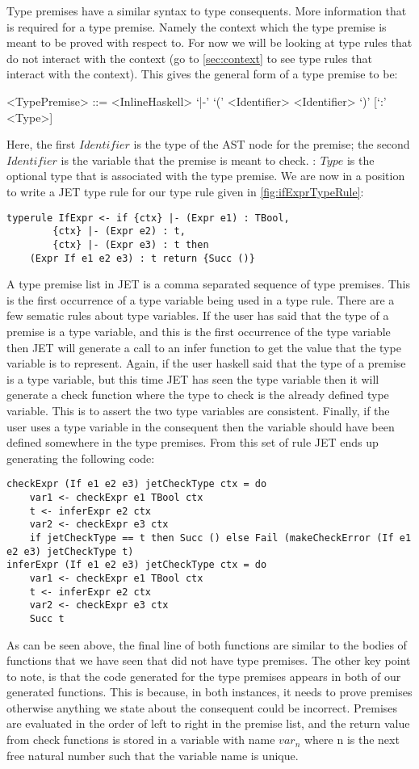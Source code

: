 Type premises have a similar syntax to type consequents.
More information that is required for a type premise.
Namely the context which the type premise is meant to be proved with respect to.
For now we will be looking at type rules that do not interact with the context (go to \autoref{sec:context} to see type rules that interact with the context).
This gives the general form of a type premise to be:
\begin{grammar}
<TypePremise> ::= <InlineHaskell> `|-' `(' <Identifier> <Identifier> `)' [`:' <Type>]
\end{grammar}
Here, the first $Identifier$ is the type of the AST node for the premise; the second $Identifier$ is the variable that the premise is meant to check.
 $:\ Type$ is the optional type that is associated with the type premise.
We are now in a position to write a JET type rule for our type rule given in \autoref{fig:ifExprTypeRule}:
\begin{lstlisting}
typerule IfExpr <- if {ctx} |- (Expr e1) : TBool, 
        {ctx} |- (Expr e2) : t, 
        {ctx} |- (Expr e3) : t then 
    (Expr If e1 e2 e3) : t return {Succ ()}
\end{lstlisting}
A type premise list in JET is a comma separated sequence of type premises.
This is the first occurrence of a type variable being used in a type rule.
There are a few sematic rules about type variables.
If the user has said that the type of a premise is a type variable, and this is the first occurrence of the type variable then JET will generate a call to an infer function to get the value that the type variable is to represent.
Again, if the user haskell said that the type of a premise is a type variable, but this time JET has seen the type variable then it will generate a check function where the type to check is the already defined type variable.
This is to assert the two type variables are consistent.
Finally, if the user uses a type variable in the consequent then the variable should have been defined somewhere in the type premises.
From this set of rule JET ends up generating the following code:
\begin{lstlisting}
checkExpr (If e1 e2 e3) jetCheckType ctx = do
    var1 <- checkExpr e1 TBool ctx
    t <- inferExpr e2 ctx
    var2 <- checkExpr e3 ctx
    if jetCheckType == t then Succ () else Fail (makeCheckError (If e1 e2 e3) jetCheckType t)
inferExpr (If e1 e2 e3) jetCheckType ctx = do
    var1 <- checkExpr e1 TBool ctx
    t <- inferExpr e2 ctx
    var2 <- checkExpr e3 ctx
    Succ t
\end{lstlisting}
As can be seen above, the final line of both functions are similar to the bodies of functions that we have seen that did not have type premises.
The other key point to note, is that the code generated for the type premises appears in both of our generated functions.
This is because, in both instances, it needs to prove premises otherwise anything we state about the consequent could be incorrect.
Premises are evaluated in the order of left to right in the premise list, and the return value from check functions is stored in a variable with name $var_n$ where n is the next free natural number such that the variable name is unique.

